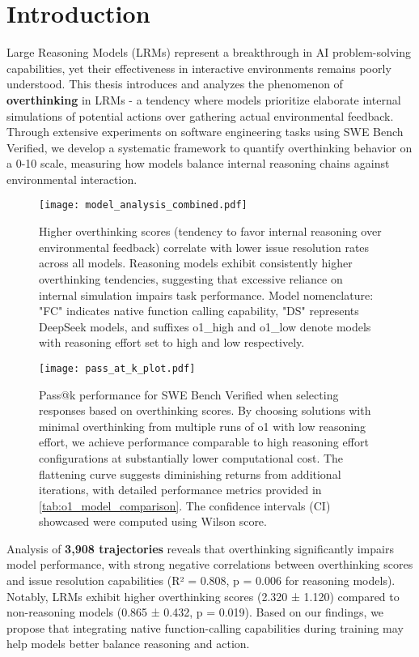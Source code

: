 \chapter{Introduction}
\label{intro}

Large Reasoning Models (LRMs) represent a breakthrough in AI problem-solving capabilities, yet their effectiveness in interactive environments remains poorly understood. This thesis introduces and analyzes the phenomenon of \textbf{overthinking} in LRMs - a tendency where models prioritize elaborate internal simulations of potential actions over gathering actual environmental feedback. Through extensive experiments on software engineering tasks using SWE Bench Verified, we develop a systematic framework to quantify overthinking behavior on a 0-10 scale, measuring how models balance internal reasoning chains against environmental interaction.

\begin{figure}[t]
    \centering
    \texttt{[image: model\_analysis\_combined.pdf]}
    \caption{Higher overthinking scores (tendency to favor internal reasoning over environmental feedback) correlate with lower issue resolution rates across all models. Reasoning models exhibit consistently higher overthinking tendencies, suggesting that excessive reliance on internal simulation impairs task performance. Model nomenclature: "FC" indicates native function calling capability, "DS" represents DeepSeek models, and suffixes o1\_high and o1\_low denote models with reasoning effort set to high and low respectively.}
    \label{fig:figure1}
\end{figure}

\begin{figure}[t]
    \centering
    \texttt{[image: pass\_at\_k\_plot.pdf]}
    \caption{Pass@k performance for SWE Bench Verified when selecting responses based on overthinking scores. By choosing solutions with minimal overthinking from multiple runs of o1 with low reasoning effort, we achieve performance comparable to high reasoning effort configurations at substantially lower computational cost. The flattening curve suggests diminishing returns from additional iterations, with detailed performance metrics provided in \cref{tab:o1_model_comparison}. The confidence intervals (CI) showcased were computed using Wilson score.}
    \label{fig:figure2}
\end{figure}

Analysis of \textbf{3,908 trajectories} reveals that overthinking significantly impairs model performance, with strong negative correlations between overthinking scores and issue resolution capabilities (R² = 0.808, p = 0.006 for reasoning models). Notably, LRMs exhibit higher overthinking scores (2.320 ± 1.120) compared to non-reasoning models (0.865 ± 0.432, p = 0.019). Based on our findings, we propose that integrating native function-calling capabilities during training may help models better balance reasoning and action.

